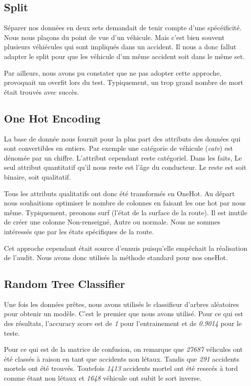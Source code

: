\documentclass[]{article}
\begin{document}
    \subsection{Split}
    Séparer nos données en deux sets demandait de tenir compte d'une spécéificité. Nous nous plaçons du point de vue d'un véhicule. 
    Mais c'est bien souvent plusieurs véhiécules qui sont impliqués dans un accident. Il nous a donc fallut adapter le split pour que 
    les véhicule d'un même accident soit dans le même set. 
    
    Par ailleurs, nous avons pu constater que ne pas adopter cette approche, provoquait un overfit lors du test. Typiquement, un trop 
    grand nombre de mort était trouvés avec succès.

    \subsection{One Hot Encoding}
    La base de donnée nous fournit pour la plus part des attributs des données qui sont convertibles en entiers. 
    Par exemple une catégorie de véhicule (\textit{catv}) est dénomée par un chiffre. L'attribut cependant reste catégoriel. Dans les faits, 
    Le seul attribut quantitatif qu'il nous reste est l'âge du conducteur. 
    Le reste est soit binaire, soit qualitatif. 
    
    Tous les attributs qualitatifs ont donc été transformés en OneHot. Au départ nous souhaitions optimiser le nombre de colonnes en 
    faisant les one hot par nous même. Typiquement, preonons surf (l'état de la surface de la route). Il est inutile de créer une colonne 
    Non-renseigné, Autre ou normale. Nous ne sommes intéressés que par les états spécifiques de la route. 

    Cet approche cependant était source d'ennuis puisqu'elle empêchait la réalisation de l'audit. Nous avons donc utilisés la méthode 
    standard pour nos oneHot. 

    \subsection{Random Tree Classifier}
    Une fois les données prêtes, nous avons utilisés le classifieur d'arbres aléatoires pour obtenir un modèle. C'est le premier que nous 
    avons utilisé. Pour ce qui est des résultats, l'accuracy score est de \textit{1} pour l'entrainement et de \textit{0.9014} pour le teste.
    
    Pour ce qui est de la matrice de confusion, on remarque que \textit{27687} véhcules ont été classés à raison en tant que accidents non létaux.
    Tandis que \textit{291} accidents mortels ont été trouvés. Toutefois \textit{1413} accidents mortel ont été resecés à tord comme étant 
    non létaux et \textit{1648} véhicule ont subit le sort inverse. 
\end{document}
